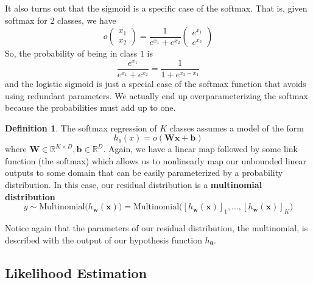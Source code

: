 \documentclass{article}
\theoremstyle{definition}
\newtheorem{definition}{Definition}[section]
\begin{document}
  It also turns out that the sigmoid is a specific case of the softmax. That is, given softmax for 2 classes, we have 
  \[o\begin{pmatrix} x_1 \\ x_2 \end{pmatrix} = \frac{1}{e^{x_1} + e^{x_2}} \begin{pmatrix} e^{x_1} \\ e^{x_2} \end{pmatrix}\]
  So, the probability of being in class $1$ is 
  \[\frac{e^{x_1}}{e^{x_1} + e^{x_2}} = \frac{1}{1 + e^{x_2 - x_1}}\]
  and the logistic sigmoid is just a special case of the softmax function that avoids using redundant parameters. We actually end up overparameterizing the softmax because the probabilities must add up to one. 

  \begin{definition}
  The softmax regression of $K$ classes assumes a model of the form 
  \[h_\theta (x) = o ( \mathbf{W} \mathbf{x} + \mathbf{b})\]
  where $\mathbf{W} \in \mathbb{R}^{K \times D}, \mathbf{b} \in \mathbb{R}^D$. Again, we have a linear map followed by some link function (the softmax) which allows us to nonlinearly map our unbounded linear outputs to some domain that can be easily parameterized by a probability distribution. In this case, our residual distribution is a \textbf{multinomial distribution} 
  \[y \sim \mathrm{Multinomial}\big( h_\mathbf{w} (\mathbf{x}) \big) = \mathrm{Multinomial}\big( [h_\mathbf{w} (\mathbf{x})]_1, \ldots, [h_\mathbf{w} (\mathbf{x})]_K \big) \]
  \end{definition}

  Notice again that the parameters of our residual distribution, the multinomial, is described with the output of our hypothesis function $h_{\boldsymbol{\theta}}$. 

  \subsection{Likelihood Estimation}
\end{document}

